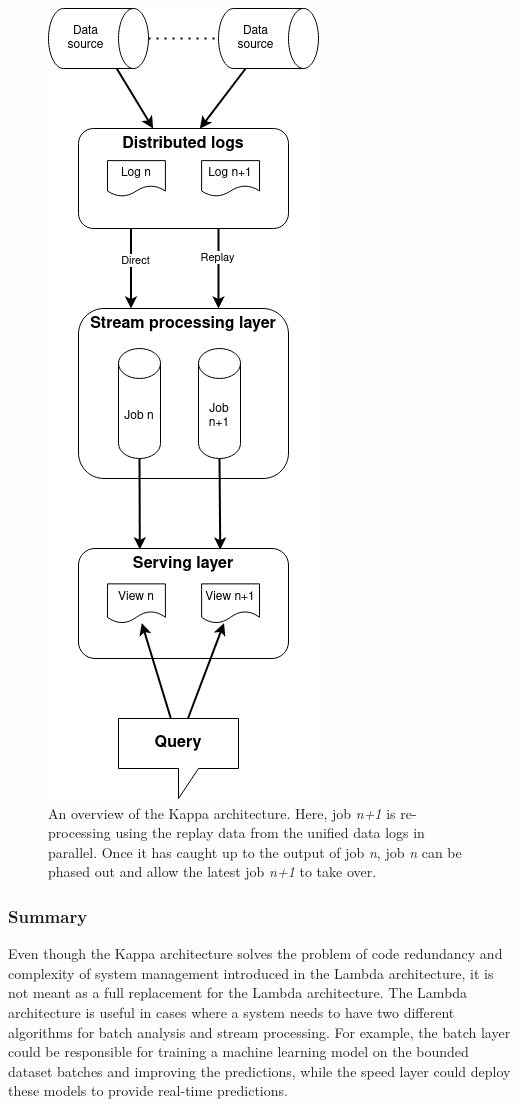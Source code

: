 \begin{figure}[!htbp]
    \centering
    \includegraphics[width=0.4\linewidth]{fig/kappa_arch.png}
    \caption{An overview of the Kappa architecture. Here, job \emph{n+1} is re-processing using the replay 
    data from the unified data logs in parallel. Once it has caught up to the output of job \emph{n}, 
    job \emph{n} can be phased out and allow the latest job \emph{n+1} to take over.}
    \label{fig:kappa_arch}
\end{figure}


\subsubsection{Summary}%
Even though the Kappa architecture solves the problem of code redundancy and complexity of 
system management introduced in the 
Lambda architecture, it is not meant as a full replacement for the Lambda architecture. 
The Lambda architecture is useful in cases where a system needs to have two different algorithms for 
batch analysis and stream processing. For example, the batch layer could be responsible for training 
a machine learning model on the bounded dataset batches and improving the 
predictions, while the speed layer could deploy these models to provide real-time predictions. 


